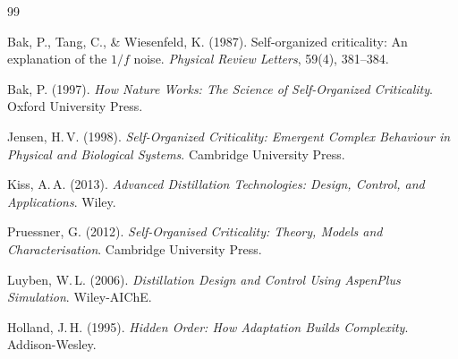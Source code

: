\documentclass[twocolumn,12pt]{article}
\begin{document}
\begin{thebibliography}{99}

Bak, P., Tang, C., \& Wiesenfeld, K. (1987).
Self-organized criticality: An explanation of the $1/f$ noise.
\textit{Physical Review Letters}, 59(4), 381--384.

Bak, P. (1997).
\textit{How Nature Works: The Science of Self-Organized Criticality}.
Oxford University Press.

Jensen, H.\,V. (1998).
\textit{Self-Organized Criticality: Emergent Complex Behaviour in
Physical and Biological Systems}.
Cambridge University Press.

Kiss, A.\,A. (2013).
\textit{Advanced Distillation Technologies: Design, Control, and
Applications}.
Wiley.

Pruessner, G. (2012).
\textit{Self-Organised Criticality: Theory, Models and Characterisation}.
Cambridge University Press.

Luyben, W.\,L. (2006).
\textit{Distillation Design and Control Using AspenPlus Simulation}.
Wiley-AIChE.

Holland, J.\,H. (1995).
\textit{Hidden Order: How Adaptation Builds Complexity}.
Addison-Wesley.

\end{thebibliography}
\end{document}

